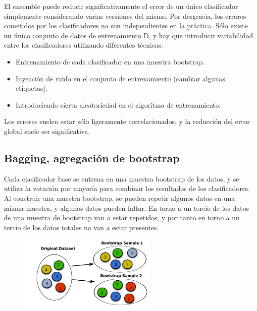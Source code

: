 El ensemble puede reducir significativamente el error de un único clasificador simplemente considerando varias versiones del mismo. Por desgracia, los errores cometidos por los clasificadores no son independientes en la práctica. Sólo existe un único conjunto de datos de entrenamiento D, y hay que introducir variabilidad entre los clasificadores utilizando diferentes técnicas:
\begin{itemize}
\item Entrenamiento de cada clasificador en una muestra bootstrap.
\item Inyección de ruido en el conjunto de entrenamiento (cambiar algunas etiquetas).
\item Introduciendo cierta aleatoriedad en el algoritmo de entrenamiento.
\end{itemize}

Los errores suelen estar sólo ligeramente correlacionados, y la reducción del error global suele ser significativa.

\subsection{Bagging, agregación de bootstrap}
Cada clasificador base se entrena en una muestra bootstrap de los datos, y se utiliza la votación por mayoría para combinar los resultados de los clasificadores. Al construir una muestra bootstrap, se pueden repetir algunos datos en una misma muestra, y algunos datos pueden faltar. En torno a un tercio de los datos de una muestra de bootstrap van a estar repetidos, y por tanto en torno a un tercio de los datos totales no van a estar presentes. 

\begin{figure}[h]
\centering
\includegraphics[width = 0.6\textwidth]{figs/bootstrap.png}
\end{figure}


